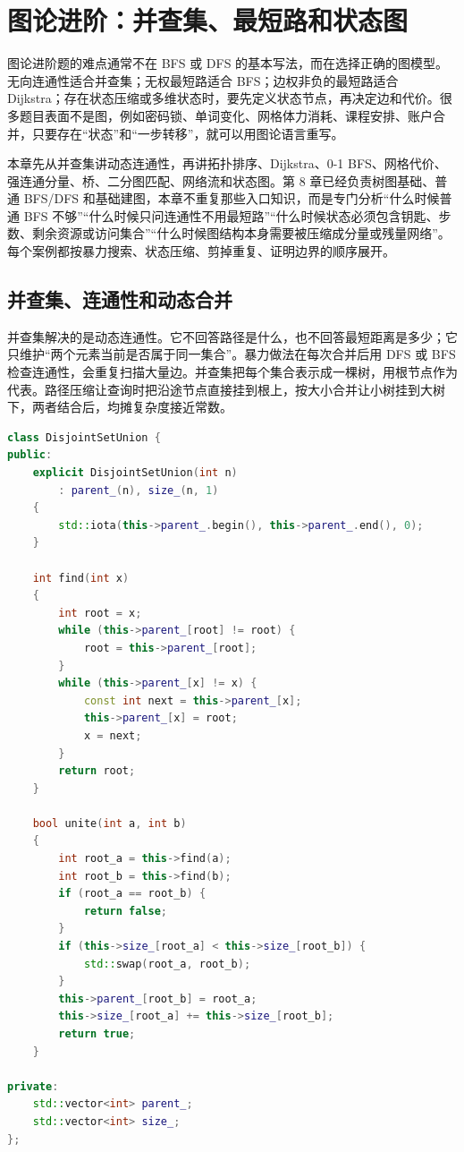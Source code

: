 \chapter{图论进阶：并查集、最短路和状态图}

图论进阶题的难点通常不在 BFS 或 DFS 的基本写法，而在选择正确的图模型。无向连通性适合并查集；无权最短路适合 BFS；边权非负的最短路适合 Dijkstra；存在状态压缩或多维状态时，要先定义状态节点，再决定边和代价。很多题目表面不是图，例如密码锁、单词变化、网格体力消耗、课程安排、账户合并，只要存在“状态”和“一步转移”，就可以用图论语言重写。

本章先从并查集讲动态连通性，再讲拓扑排序、Dijkstra、0-1 BFS、网格代价、强连通分量、桥、二分图匹配、网络流和状态图。第 8 章已经负责树图基础、普通 BFS/DFS 和基础建图，本章不重复那些入口知识，而是专门分析“什么时候普通 BFS 不够”“什么时候只问连通性不用最短路”“什么时候状态必须包含钥匙、步数、剩余资源或访问集合”“什么时候图结构本身需要被压缩成分量或残量网络”。每个案例都按暴力搜索、状态压缩、剪掉重复、证明边界的顺序展开。

\section{并查集、连通性和动态合并}

并查集解决的是动态连通性。它不回答路径是什么，也不回答最短距离是多少；它只维护“两个元素当前是否属于同一集合”。暴力做法在每次合并后用 DFS 或 BFS 检查连通性，会重复扫描大量边。并查集把每个集合表示成一棵树，用根节点作为代表。路径压缩让查询时把沿途节点直接挂到根上，按大小合并让小树挂到大树下，两者结合后，均摊复杂度接近常数。

\begin{lstlisting}[language=C++,caption={并查集：迭代 find、路径压缩和按大小合并}]
class DisjointSetUnion {
public:
    explicit DisjointSetUnion(int n)
        : parent_(n), size_(n, 1)
    {
        std::iota(this->parent_.begin(), this->parent_.end(), 0);
    }

    int find(int x)
    {
        int root = x;
        while (this->parent_[root] != root) {
            root = this->parent_[root];
        }
        while (this->parent_[x] != x) {
            const int next = this->parent_[x];
            this->parent_[x] = root;
            x = next;
        }
        return root;
    }

    bool unite(int a, int b)
    {
        int root_a = this->find(a);
        int root_b = this->find(b);
        if (root_a == root_b) {
            return false;
        }
        if (this->size_[root_a] < this->size_[root_b]) {
            std::swap(root_a, root_b);
        }
        this->parent_[root_b] = root_a;
        this->size_[root_a] += this->size_[root_b];
        return true;
    }

private:
    std::vector<int> parent_;
    std::vector<int> size_;
};
\end{lstlisting}


